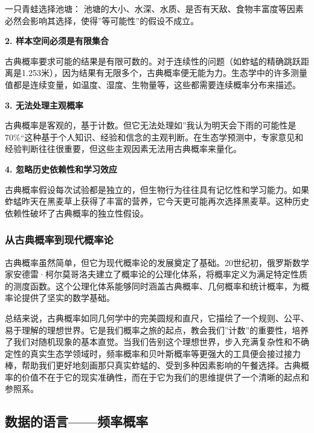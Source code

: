 \documentclass[
]{book}
\begin{document}
一只青蛙选择池塘： 池塘的大小、水深、水质、是否有天敌、食物丰富度等因素必然会影响其选择，使得''等可能性''的假设不成立。

\textbf{2. 样本空间必须是有限集合}

古典概率要求可能的结果是有限可数的。对于连续性的问题（如蚱蜢的精确跳跃距离是1.253米），因为结果有无限多个，古典概率便无能为力。生态学中的许多测量值都是连续变量，如温度、湿度、生物量等，这些都需要连续概率分布来描述。

\textbf{3. 无法处理主观概率}

古典概率是客观的，基于计数。但它无法处理如''我认为明天会下雨的可能性是70\%``这种基于个人知识、经验和信念的主观判断。在生态学预测中，专家意见和经验判断往往很重要，但这些主观因素无法用古典概率来量化。

\textbf{4. 忽略历史依赖性和学习效应}

古典概率假设每次试验都是独立的，但生物行为往往具有记忆性和学习能力。如果蚱蜢昨天在黑麦草上获得了丰富的营养，它今天更可能再次选择黑麦草。这种历史依赖性破坏了古典概率的独立性假设。

\hypertarget{ux4eceux53e4ux5178ux6982ux7387ux5230ux73b0ux4ee3ux6982ux7387ux8bba}{%
\subsubsection{从古典概率到现代概率论}\label{ux4eceux53e4ux5178ux6982ux7387ux5230ux73b0ux4ee3ux6982ux7387ux8bba}}

古典概率虽然简单，但它为现代概率论的发展奠定了基础。20世纪初，俄罗斯数学家安德雷·柯尔莫哥洛夫建立了概率论的公理化体系，将概率定义为满足特定性质的测度函数。这个公理化体系能够同时涵盖古典概率、几何概率和统计概率，为概率论提供了坚实的数学基础。

总结来说，古典概率如同几何学中的完美圆规和直尺，它描绘了一个规则、公平、易于理解的理想世界。它是我们概率之旅的起点，教会我们''计数''的重要性，培养了我们对随机现象的基本直觉。当我们告别这个理想世界，步入充满复杂性和不确定性的真实生态学领域时，频率概率和贝叶斯概率等更强大的工具便会接过接力棒，帮助我们更好地刻画那只真实蚱蜢的、受到多种因素影响的午餐选择。古典概率的价值不在于它的现实准确性，而在于它为我们的思维提供了一个清晰的起点和参照系。

\hypertarget{ux6570ux636eux7684ux8bedux8a00ux9891ux7387ux6982ux7387}{%
\subsection{数据的语言------频率概率}\label{ux6570ux636eux7684ux8bedux8a00ux9891ux7387ux6982ux7387}}
\end{document}

